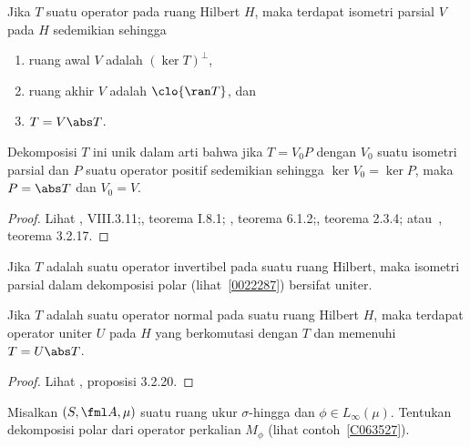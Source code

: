 




\begin{thm}\label{0022287} Jika $T$ suatu operator pada ruang
Hilbert $H$, maka terdapat isometri parsial $V$ pada $H$ sedemikian sehingga
 \begin{enumerate}
    \item[(i)] ruang awal $V$ adalah $(\ker T)^\perp$,
    \item[(ii)] ruang akhir $V$ adalah $\clo{\ran T}$, dan
    \item[(iii)] $T = V\abs T$.
 \end{enumerate}
Dekomposisi $T$ ini unik dalam arti bahwa jika $T = V_0P$ dengan $V_0$ suatu
isometri parsial dan $P$ suatu operator positif sedemikian sehingga $\ker V_0 = \ker P$, maka $P =
\abs T$ dan $V_0 = V$.
\end{thm}

\begin{proof} Lihat \cite{Conway:1990}, VIII.3.11;\allowbreak \cite{Davidson:1996}, teorema I.8.1;
\allowbreak \cite{KadisonR:1983}, teorema 6.1.2;\allowbreak \cite{Murphy:1990}, teorema 2.3.4;
atau~\cite{Pedersen:1995}, teorema 3.2.17. \ns
\end{proof}

\begin{cor} Jika $T$ adalah suatu
operator invertibel pada suatu ruang Hilbert, maka isometri parsial dalam dekomposisi polar
(lihat~\ref{0022287}) bersifat uniter.
\end{cor}

\begin{prop} Jika $T$ adalah suatu
operator normal pada suatu ruang Hilbert $H$, maka terdapat operator uniter $U$ pada $H$
yang berkomutasi dengan $T$ dan memenuhi $T = U\abs T$.
\end{prop}

\begin{proof} Lihat \cite{Pedersen:1995}, proposisi 3.2.20.\ns \end{proof}

\begin{exer} Misalkan $(S, \fml A,\mu)$ suatu ruang ukur $\sigma$-hingga dan $\phi \in
L_\infty(\mu)$. Tentukan dekomposisi polar dari
operator perkalian $M_\phi$ (lihat contoh~\ref{C063527}).
\end{exer}









